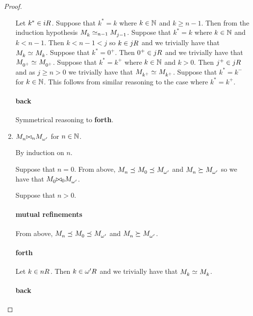 \begin{proof}
\begin{enumerate}
    Let $k^* \in \kSuccessors{}{i}$.
    Suppose that $k^* = k$ where $k \in \mathbb{N}$ and $k \geq n - 1$.
    Then from the induction hypothesis $\kPModel{k} \bisimilar [n-1] \kPModel{j - 1}$.
    Suppose that $k^* = k$ where $k \in \mathbb{N}$ and $k < n - 1$.
    Then $k < n - 1 < j$ so $k \in \kSuccessors{}{j}$ and we trivially have that $\kPModel{k} \bisimilar \kPModel{k}$.
    Suppose that $k^* = 0^+$.
    Then $0^+ \in \kSuccessors{}{j}$ and we trivially have that $\kPModel{0^+} \bisimilar \kPModel{0^+}$.
    Suppose that $k^* = k^+$ where $k \in \mathbb{N}$ and $k > 0$.
    Then $j^+ \in \kSuccessors{}{j}$ and as $j \geq n > 0$ we trivially have that $\kPModel{k^+} \bisimilar \kPModel{k^+}$.
    Suppose that $k^* = k^-$ for $k \in \mathbb{N}$. This follows from similar reasoning to the case where $k^* = k^+$.

    \paragraph{back}

    Symmetrical reasoning to {\bf forth}.

    \item $\kPModel{n} \bisimref[n] \kPModel{\omega'}$ for $n \in \mathbb{N}$.

    By induction on $n$.

    Suppose that $n = 0$. 
    From above, $\kPModel{n} \refines \kPModel{0} \refines \kPModel{\omega'}$ and $\kPModel{n} \simulates \kPModel{\omega'}$ so we have that $\kPModel{0} \bisimref[0] \kPModel{\omega'}$.

    Suppose that $n > 0$.

    \paragraph{mutual refinements}

    From above, $\kPModel{n} \refines \kPModel{0} \refines \kPModel{\omega'}$ and $\kPModel{n} \simulates \kPModel{\omega'}$.

    \paragraph{forth}

    Let $k \in \kSuccessors{}{n}$. 
    Then $k \in \kSuccessors{}{\omega'}$ and we trivially have that $\kPModel{k} \bisimilar \kPModel{k}$.

    \paragraph{back}


\end{enumerate}
\end{proof}
